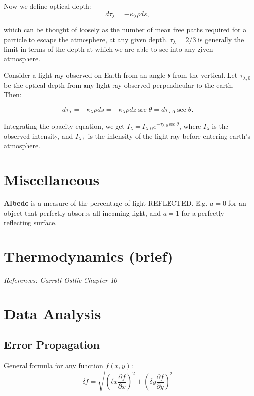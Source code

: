 \documentclass[12pt]{article}
\begin{document}
Now we define optical depth:
\[d\tau_{\lambda} = -\kappa_{\lambda}\rho ds,\]

which can be thought of loosely as the number of mean free paths required for a particle to escape the atmosphere, at any given depth. $\tau_{\lambda} = 2/3$ is generally the limit in terms of the depth at which we are able to see into any given atmosphere.

Consider a light ray observed on Earth from an angle $\theta$ from the vertical. Let $\tau_{\lambda, 0}$ be the optical depth from any light ray observed perpendicular to the earth. Then: 

\[d\tau_{\lambda} = -\kappa_{\lambda}\rho ds = -\kappa_{\lambda}\rho dz \sec{\theta} = d\tau_{\lambda, 0}\sec{\theta}.\]

Integrating the opacity equation, we get 
$I_{\lambda} = I_{\lambda,0}e^{-\tau_{\lambda, 0}\sec{\theta}}$, where $I_{\lambda}$ is the observed intensity, and $I_{\lambda,0}$ is the intensity of the light ray before entering earth's atmosphere.

\newpage
\section{Miscellaneous}

\textbf{Albedo} is a measure of the percentage of light REFLECTED. E.g. $a = 0$ for an object that perfectly absorbs all incoming light, and $a=1$ for a perfectly reflecting surface.

\newpage
\section{Thermodynamics (brief)}
\textit{References: Carroll Ostlie Chapter 10}

\newpage
\section{Data Analysis}

\subsection{Error Propagation}

General formula for any function $f(x,y)$: 
\[\delta f = \sqrt{\left(\delta x \frac{\partial f}{\partial x}\right)^2 + \left(\delta y \frac{\partial f}{\partial y}\right)^2}\]
\end{document}
